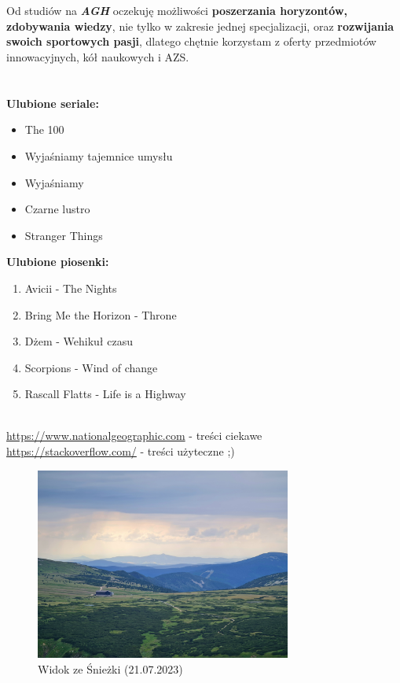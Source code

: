 \documentclass{article}
\begin{document}
\\\\
Od studiów na \textbf{\emph{AGH}} oczekuję możliwości \textbf{poszerzania horyzontów, zdobywania wiedzy}, nie tylko w zakresie jednej specjalizacji, oraz \textbf{rozwijania swoich sportowych pasji}, dlatego chętnie korzystam z oferty przedmiotów innowacyjnych, kół naukowych i AZS.\\\\\\
\textbf{Ulubione seriale:}
\begin{itemize}
    \item The 100
    \item Wyjaśniamy tajemnice umysłu
    \item Wyjaśniamy
    \item Czarne lustro
    \item Stranger Things
\end{itemize}
\textbf{Ulubione piosenki:}
\begin{enumerate}
    \item Avicii - The Nights
    \item Bring Me the Horizon - Throne
    \item Dżem - Wehikuł czasu
    \item Scorpions - Wind of change
    \item Rascall Flatts - Life is a Highway
\end{enumerate}
~\\
\url{https://www.nationalgeographic.com} - treści ciekawe\\
\url{https://stackoverflow.com/} - treści użyteczne ;)
~\\
\begin{figure}[h]
    \centering 
    \includegraphics[width=0.75\textwidth]{sniezka.jpg}
    \caption{Widok ze Śnieżki (21.07.2023)} 
\end{figure}
\end{document}
